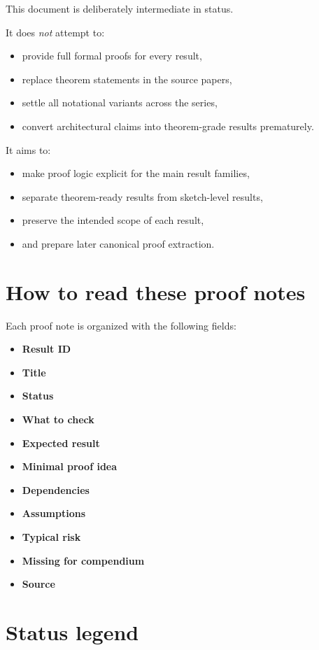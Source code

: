 \documentclass[12pt]{article}
\begin{document}
	This document is deliberately intermediate in status.
	
	It does \emph{not} attempt to:
	\begin{itemize}[leftmargin=2em]
		\item provide full formal proofs for every result,
		\item replace theorem statements in the source papers,
		\item settle all notational variants across the series,
		\item convert architectural claims into theorem-grade results prematurely.
	\end{itemize}
	
	It aims to:
	\begin{itemize}[leftmargin=2em]
		\item make proof logic explicit for the main result families,
		\item separate theorem-ready results from sketch-level results,
		\item preserve the intended scope of each result,
		\item and prepare later canonical proof extraction.
	\end{itemize}
	
	\section{How to read these proof notes}
	
	Each proof note is organized with the following fields:
	
	\begin{itemize}[leftmargin=2em]
		\item \textbf{Result ID}
		\item \textbf{Title}
		\item \textbf{Status}
		\item \textbf{What to check}
		\item \textbf{Expected result}
		\item \textbf{Minimal proof idea}
		\item \textbf{Dependencies}
		\item \textbf{Assumptions}
		\item \textbf{Typical risk}
		\item \textbf{Missing for compendium}
		\item \textbf{Source}
	\end{itemize}
	
	\section{Status legend}
	
\end{document}
